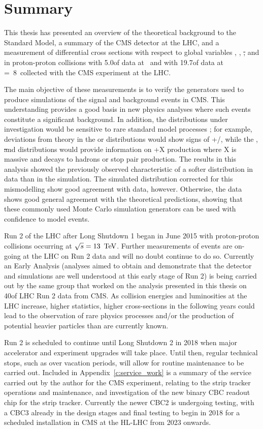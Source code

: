 \chapter{Summary }
\label{c:summary}

This thesis has presented an overview of the theoretical background to the Standard Model, a summary of the
CMS detector at the LHC, and a measurement of differential \ttbar cross sections with respect to global
variables \met, \HT, \st, \mt and \wpt in proton-proton collisions with 5.0\fbinv of data at ~\TeV and
with 19.7\fbinv of data at \roots=~8~\TeV collected with the CMS experiment at the LHC. 

The main objective of these measurements is to verify the generators used to produce simulations of the signal
and background events in CMS. This understanding provides a good basis in new physics analyses where such
events constitute a significant background. In addition, the distributions under investigation would be
sensitive to rare standard model processes ; for example, deviations from theory in the \met or \mt
distributions would show signs of \ttbar+\Z/\W, while the \HT, \st and \wpt distributions would provide
information on \ttbar+X production where X is massive and decays to hadrons or stop pair production. The
results in this analysis showed the previously observed characteristic of a softer \pt distribution in data
than in the simulation. The simulated distribution corrected for this mismodelling show good agreement with
data, however. Otherwise, the data shows good general agreement with the theoretical predictions, showing that
these commonly used Monte Carlo simulation generators can be used with confidence to model \ttbar events.

Run 2 of the LHC after Long Shutdown 1 began in June 2015 with proton-proton collisions occurring at
$\sqrt{s}=13~\,\text{Te\hspace{-.08em}V}$. Further measurements of \ttbar events are on-going at the LHC on Run 2 data and will no
doubt continue to do so. Currently an Early Analysis (analyses aimed to obtain and demonstrate that the
detector and simulations are well understood at this early stage of Run 2) is being carried out by the same
group that worked on the analysis presented in this thesis on 40\pbinv of LHC Run 2 data from CMS. As
collision energies and luminosities at the LHC increase, higher statistics, higher cross-sections in the
following years could lead to the observation of rare physics processes and/or the production of potential
heavier particles than are currently known.

Run 2 is scheduled to continue until Long Shutdown 2 in 2018 when major accelerator and experiment upgrades
will take place. Until then, regular technical stops, such as over vacation periods, will allow for routine
maintenance to be carried out. Included in Appendix~\ref{c:service_work} is a summary of the service carried
out by the author for the CMS experiment, relating to the strip tracker operations and maintenance, and
investigation of the new binary CBC readout chip for the strip tracker. Currently the newer CBC2 is undergoing
testing, with a CBC3 already in the design stages and final testing to begin in 2018 for a scheduled
installation in CMS at the HL-LHC from 2023 onwards.

